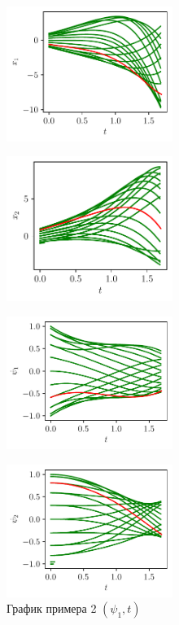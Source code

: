 \documentclass[12pt, a4paper]{article} %
\begin{document}
\begin{figure}[H]
    \begin{multicols}{2}
        \begin{centering}
            \includegraphics[width=0.48\textwidth]{figures/ex2_x1t.pdf}
            \label{fig:ex2_x1t}
            \caption{График примера 2 $(x_1, t)$}
            \hfill 
            \includegraphics[width=0.48\textwidth]{figures/ex2_x2t.pdf}
            \label{fig:ex2_x2t}
            \caption{График примера 2 $(x_2, t)$}
        \end{centering} 
    \end{multicols}
    \vfill
    \begin{multicols}{2}
        \begin{centering}
            \includegraphics[width=0.48\textwidth]{figures/ex2_p1t.pdf}
            \label{fig:ex2_p1t}
            \caption{График примера 2 $(\psi_1, t)$}
            \hfill 
            \includegraphics[width=0.48\textwidth]{figures/ex2_p2t.pdf}

\end{centering}
\end{multicols}
\end{figure}
\end{document}

